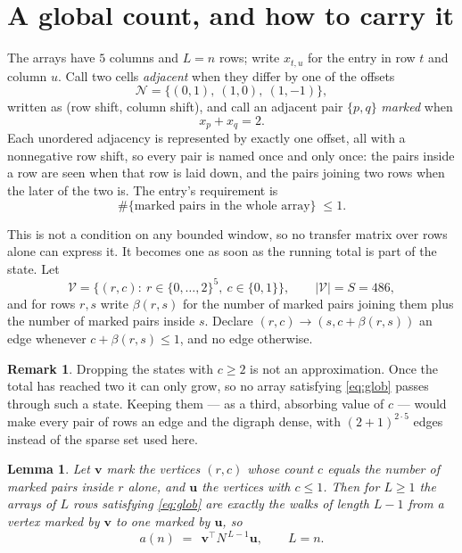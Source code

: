 \documentclass[11pt,a4paper]{article}
\theoremstyle{plain}
\newtheorem{lemma}[theorem]{Lemma}
\theoremstyle{definition}
\newtheorem{remark}[theorem]{Remark}
\begin{document}
\section{A global count, and how to carry it}

The arrays have $5$ columns and $L=n$ rows; write $x_{t,u}$ for the entry in
row $t$ and column $u$. Call two cells \emph{adjacent} when they differ by one of the
offsets
\[
\mathcal N=\{(0,1),\ (1,0),\ (1,-1)\},
\]
written as (row shift, column shift), and call an adjacent pair $\{p,q\}$
\emph{marked} when
\[
x_{p}+x_{q}=2 .
\]
Each unordered adjacency is represented by exactly one offset, all with a nonnegative row
shift, so every pair is named once and only once: the pairs inside a row are seen when
that row is laid down, and the pairs joining two rows when the later of the two is. The
entry's requirement is
\begin{equation}\label{eq:glob}
\#\{\text{marked pairs in the whole array}\}\;\le1.
\end{equation}

This is not a condition on any bounded window, so no transfer matrix over rows alone can
express it. It becomes one as soon as the running total is part of the state. Let
\[
\mathcal V=\bigl\{(r,c):\ r\in\{0,\dots,2\}^{5},\ c\in\{0,1\}\bigr\},
\qquad |\mathcal V|=S=486,
\]
and for rows $r,s$ write $\beta(r,s)$ for the number of marked pairs joining them plus the
number of marked pairs inside $s$. Declare $(r,c)\to(s,c+\beta(r,s))$ an edge whenever
$c+\beta(r,s)\le1$, and no edge otherwise.

\begin{remark}
Dropping the states with $c\ge2$ is not an approximation. Once the total has reached two it
can only grow, so no array satisfying \eqref{eq:glob} passes through such a state. Keeping
them --- as a third, absorbing value of $c$ --- would make every pair of rows an edge and
the digraph dense, with $(2+1)^{2\cdot5}$ edges instead of the sparse set used here.
\end{remark}

\begin{lemma}\label{lem:walk}
Let $\mathbf{v}$ mark the vertices $(r,c)$ whose count $c$ equals the number of marked pairs
inside $r$ alone, and $\mathbf{u}$ the vertices with $c\le1$. Then for $L\ge1$ the arrays
of $L$ rows satisfying \eqref{eq:glob} are exactly the walks of length $L-1$ from a
vertex marked by $\mathbf{v}$ to one marked by $\mathbf{u}$, so
\[
a(n)\;=\;\,\mathbf{v}^{\!\top}N^{\,L-1}\mathbf{u},\qquad L=n .
\]
\end{lemma}
\end{document}
